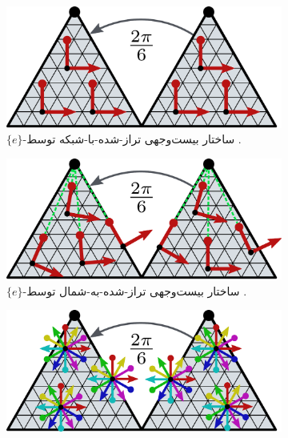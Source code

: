 \begin{figure}
    \centering
    \begin{subfigure}[b]{0.31\textwidth}
        \centering
        \includegraphics[width=1.\textwidth]{figures/icosahedron_G_structure_1.pdf}
        \vspace*{-6pt}
        \captionsetup{width=.9\textwidth}
        \caption{\small
            $\{e\}$-ساختار بیست‌وجهی تراز-شده-با-شبکه توسط \citet{liu2018icoAltAz}.
        }
        \label{fig:G_structure_ico_1}
    \end{subfigure}
    \hfill
    \begin{subfigure}[b]{0.31\textwidth}
        \centering
        \includegraphics[width=1.\textwidth]{figures/icosahedron_G_structure_2.pdf}
        \vspace*{-6pt}
        \captionsetup{width=.9\textwidth}
        \caption{\small
            $\{e\}$-ساختار بیست‌وجهی تراز-شده-به-شمال توسط \citet{zhang2019orientation}.
        }
        \label{fig:G_structure_ico_2}
    \end{subfigure}
    \hfill
    \begin{subfigure}[b]{0.31\textwidth}
        \centering
        \includegraphics[width=1.\textwidth]{figures/icosahedron_G_structure_3.pdf}

\end{subfigure}
\end{figure}
